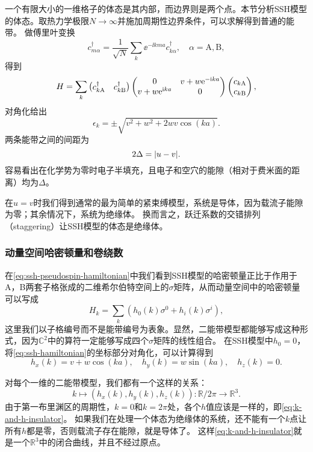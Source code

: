 一个有限大小的一维格子的体态是其内部，而边界则是两个点。本节分析SSH模型的体态。取热力学极限$N \to \infty$并施加周期性边界条件，可以求解得到普通的能带。
做傅里叶变换
\begin{equation}
    c_{m \alpha}^\dagger = \frac{1}{\sqrt{N}} \sum_k \ee^{- \ii k m a} c_{k \alpha}^\dagger, \quad \alpha = \text{A}, \text{B},
\end{equation}
得到
\begin{equation}
    H = \sum_k \pmqty{c^\dagger_{k \text{A}} & c^\dagger_{k \text{B}}} \pmqty{ 0 & v + w \ee^{- \ii k a} \\ v + w \ee^{\ii k a} & 0 } \pmqty{ c_{k \text{A}} \\ c_{k \text{B}} },
\end{equation}
对角化给出
\begin{equation}
    \epsilon_{k} = \pm \sqrt{ v^2 + w^2 + 2 wv \cos(ka) }.
    \label{eq:ssh-energy-band}
\end{equation}
两条能带之间的间距为
\begin{equation}
    2 \Delta = \abs{u - v}.
\end{equation}
容易看出在化学势为零时电子半填充，且电子和空穴的能隙（相对于费米面的距离）均为$\Delta$。

在$u=v$时我们得到通常的最为简单的紧束缚模型，系统是导体，因为载流子能隙为零；其余情况下，系统为绝缘体。
换而言之，跃迁系数的交错排列（staggering）让SSH模型的体态是绝缘体。

\subsubsection{动量空间哈密顿量和卷绕数}

在\eqref{eq:ssh-pseudospin-hamiltonian}中我们看到SSH模型的哈密顿量正比于作用于A，B两套子格张成的二维希尔伯特空间上的$\sigma$矩阵，从而动量空间中的哈密顿量可以写成
\begin{equation}
    H_k = \sum_{k} (h_0(k) \sigma^0 + h_i(k) \sigma^i),
\end{equation}
这里我们以子格编号而不是能带编号为表象。显然，二能带模型都能够写成这种形式，因为$\mathbb{C}^2$中的算符一定能够写成四个$\sigma$矩阵的线性组合。
在SSH模型中$h_0 = 0$，将\eqref{eq:ssh-hamiltonian}的坐标部分对角化，可以计算得到
\begin{equation}
    h_x(k) = v + w \cos(ka), \quad h_y(k) = w \sin(ka), \quad h_z(k) = 0.
    \label{eq:ssh-band-curve}
\end{equation}

对每个一维的二能带模型，我们都有一个这样的关系：
\begin{equation}
    k \mapsto (h_x(k), h_y(k), h_z(k)) : \mathbb{R} / 2 \pi \to \mathbb{R}^3.
    \label{eq:k-and-h-insulator}
\end{equation}
由于第一布里渊区的周期性，$k = 0$和$k = 2\pi$处，各个$h$值应该是一样的，即\eqref{eq:k-and-h-insulator}。
如果我们在处理一个体态为绝缘体的系统，还不能有一个$k$点让所有$h$都是零，否则载流子存在能隙，就是导体了。
这样\eqref{eq:k-and-h-insulator}就是一个$\mathbb{R}^3$中的闭合曲线，并且不经过原点。

